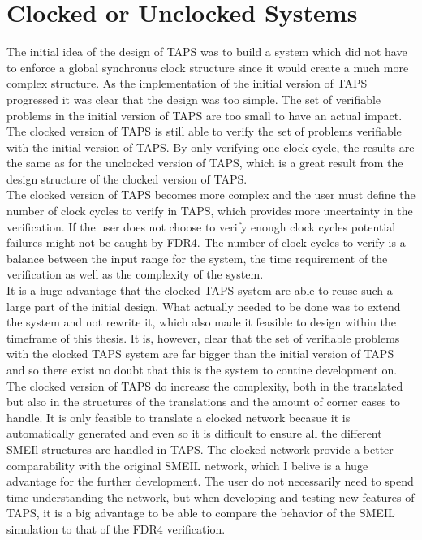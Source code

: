 \section{Clocked or Unclocked \cspm{} Systems}
The initial idea of the design of TAPS was to build a system which did not have to enforce a global synchronus clock structure since it would create a much more complex structure. As the implementation of the initial version of TAPS progressed it was clear that the design was too simple. The set of verifiable problems in the initial version of TAPS are too small to have an actual impact.\\

The clocked version of TAPS is still able to verify the set of problems verifiable with the initial version of TAPS. By only verifying one clock cycle, the results are the same as for the unclocked version of TAPS, which is a great result from the design structure of the clocked version of TAPS. \\

The clocked version of TAPS becomes more complex and the user must define the number of clock cycles to verify in TAPS, which provides more uncertainty in the verification. If the user does not choose to verify enough clock cycles potential failures might not be caught by FDR4. The number of clock cycles to verify is a balance between the input range for the system, the time requirement of the verification as well as the complexity of the system. \\

It is a huge advantage that the clocked TAPS system are able to reuse such a large part of the initial design. What actually needed to be done was to extend the system and not rewrite it, which also made it feasible to design within the timeframe of this thesis. It is, however, clear that the set of verifiable problems with the clocked TAPS system are far bigger than the initial version of TAPS and so there exist no doubt that this is the system to contine development on. The clocked version of TAPS do increase the complexity, both in the translated \cspm{} but also in the structures of the translations and the amount of corner cases to handle. It is only feasible to translate a clocked network becasue it is automatically generated and even so it is difficult to ensure all the different SMEIl structures are handled in TAPS.
The clocked \cspm{} network provide a better comparability with the original SMEIL network, which I belive is a huge advantage for the further development. The user do not necessarily need to spend time understanding the \cspm{} network, but when developing and testing new features of TAPS, it is a big advantage to be able to compare the behavior of the SMEIL simulation to that of the FDR4 verification. \\

